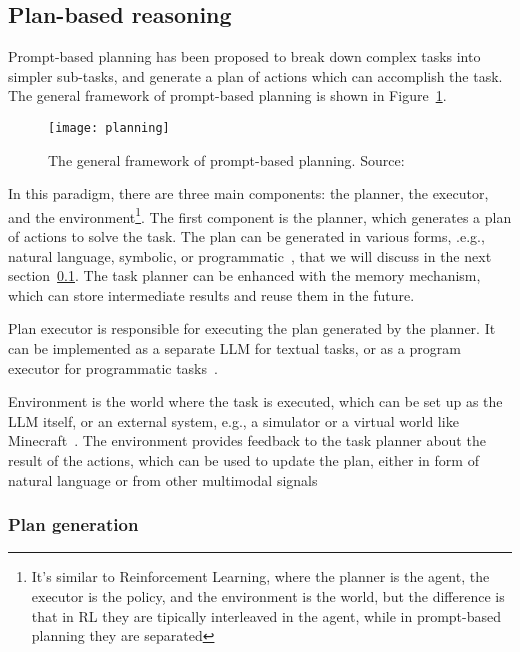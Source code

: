 \subsection{Plan-based reasoning}
\label{subsec:plan-based}

Prompt-based planning has been proposed to break down complex tasks into simpler sub-tasks, and generate a plan of actions which can accomplish the task.
The general framework of prompt-based planning is shown in Figure~\ref{fig:planning}.

\begin{figure}[h!]
	\centering
	\texttt{[image: planning]}
	\caption{The general framework of prompt-based planning. Source: \textcite{survey}}
	\label{fig:planning}
\end{figure}

In this paradigm, there are three main components: the planner, the executor, and the environment\footnote{It's similar to Reinforcement Learning, where the planner is the agent, the executor is the policy, and the environment is the world, but the difference is that in RL they are tipically interleaved in the agent, while in prompt-based planning they are separated}.
The first component is the planner, which generates a plan of actions to solve the task.
The plan can be generated in various forms, .e.g., natural language, symbolic, or programmatic~\cite{gao2022pal, zhou2022least}, that we will discuss in the next section~\ref{subsec:plan-based}.
The task planner can be enhanced with the memory mechanism, which can store intermediate results and reuse them in the future.

Plan executor is responsible for executing the plan generated by the planner.
It can be implemented as a separate LLM for textual tasks, or as a program executor for programmatic tasks~\cite{wang2023plan, gao2022pal}.

Environment is the world where the task is executed, which can be set up as the LLM itself, or an external system, e.g., a simulator or a virtual world like Minecraft~\cite{yao2023tree, wang2023voyager}.
The environment provides feedback to the task planner about the result of the actions, which can be used to update the plan, either in form of natural language or from other multimodal signals~\cite{shinn2023reflexion, lu2023multimodal}

\subsubsection{Plan generation}
\label{subsubsec:plan-generation}

